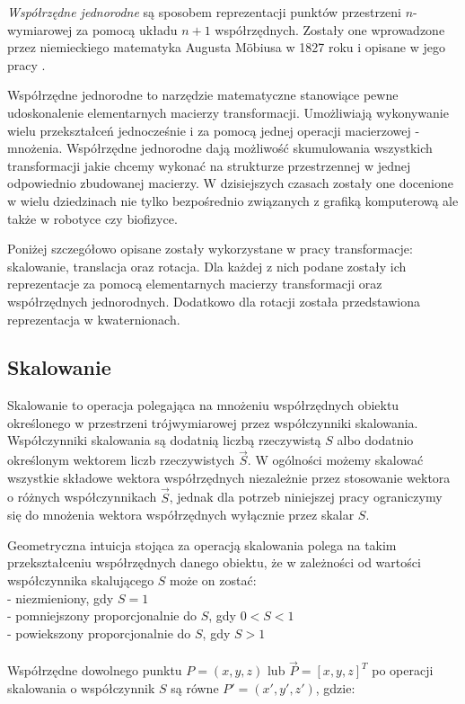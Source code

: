 \documentclass[licencjacka]{pracamgr}
\begin{document}
\textit{Współrzędne jednorodne} są sposobem reprezentacji punktów przestrzeni $n$-wymiarowej za pomocą układu $n+1$ współrzędnych. Zostały one wprowadzone przez niemieckiego matematyka Augusta Möbiusa w 1827 roku i opisane w jego pracy \cite{mobius1827}. 

Współrzędne jednorodne to narzędzie matematyczne stanowiące pewne udoskonalenie elementarnych macierzy transformacji. Umożliwiają wykonywanie wielu przekształceń jednocześnie i za pomocą jednej operacji macierzowej - mnożenia. Współrzędne jednorodne dają możliwość skumulowania wszystkich transformacji jakie chcemy wykonać na strukturze przestrzennej w jednej odpowiednio zbudowanej macierzy. W dzisiejszych czasach zostały one docenione w wielu dziedzinach nie tylko bezpośrednio związanych z grafiką komputerową ale także w robotyce czy biofizyce.

Poniżej szczegółowo opisane zostały wykorzystane w pracy transformacje: skalowanie, translacja oraz rotacja. Dla każdej z nich podane zostały ich reprezentacje za pomocą elementarnych macierzy transformacji oraz współrzędnych jednorodnych. Dodatkowo dla rotacji została przedstawiona reprezentacja w kwaternionach.

\subsection{Skalowanie}
Skalowanie to operacja polegająca na mnożeniu współrzędnych obiektu określonego w przestrzeni trójwymiarowej przez współczynniki skalowania. Współczynniki skalowania są dodatnią liczbą rzeczywistą $S$ albo dodatnio określonym wektorem liczb rzeczywistych $\vec{S}$. W ogólności możemy skalować wszystkie składowe wektora współrzędnych niezależnie przez stosowanie wektora o różnych współczynnikach $\vec{S}$, jednak dla potrzeb niniejszej pracy ograniczymy się do mnożenia wektora współrzędnych wyłącznie przez skalar $S$.

Geometryczna intuicja stojąca za operacją skalowania polega na takim przekształceniu współrzędnych danego obiektu, że w zależności od wartości współczynnika skalującego $S$ może on zostać: 
\\
- niezmieniony, gdy $S=1$
\\
- pomniejszony proporcjonalnie do $S$, gdy $0<S<1$
\\
- powiekszony proporcjonalnie do $S$, gdy $S>1$
\\
\\
Współrzędne dowolnego punktu $P=(x,y,z)$ lub $\vec{P}=[x, y, z]^T$ po operacji skalowania o współczynnik $S$ są równe $P'=(x',y',z')$, gdzie:
\end{document}
